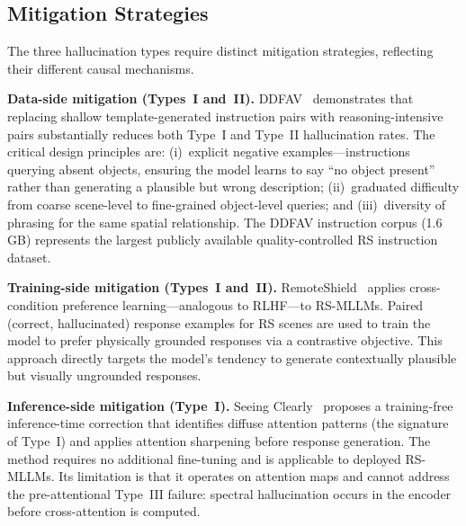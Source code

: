 \subsection{Mitigation Strategies}\label{sec7:mitig}

The three hallucination types require distinct mitigation strategies,
reflecting their different causal mechanisms.

\textbf{Data-side mitigation (Types~I and~II).}
DDFAV~\cite{ddfav2025} demonstrates that replacing shallow template-generated
instruction pairs with reasoning-intensive pairs substantially reduces
both Type~I and Type~II hallucination rates. The critical design principles
are: (i)~explicit negative examples---instructions querying absent objects,
ensuring the model learns to say ``no object present'' rather than generating
a plausible but wrong description; (ii)~graduated difficulty from coarse
scene-level to fine-grained object-level queries; and (iii)~diversity of
phrasing for the same spatial relationship. The DDFAV instruction corpus
(1.6\,GB) represents the largest publicly available quality-controlled RS
instruction dataset.

\textbf{Training-side mitigation (Types~I and~II).}
RemoteShield~\cite{remoteshield2026} applies cross-condition preference
learning---analogous to RLHF---to RS-MLLMs. Paired (correct, hallucinated)
response examples for RS scenes are used to train the model to prefer
physically grounded responses via a contrastive objective. This approach
directly targets the model's tendency to generate contextually plausible
but visually ungrounded responses.

\textbf{Inference-side mitigation (Type~I).}
Seeing Clearly~\cite{seeingclearly2026} proposes a training-free
inference-time correction that identifies diffuse attention patterns
(the signature of Type~I) and applies attention sharpening before
response generation. The method requires no additional fine-tuning and
is applicable to deployed RS-MLLMs. Its limitation is that it operates
on attention maps and cannot address the pre-attentional Type~III
failure: spectral hallucination occurs in the encoder before
cross-attention is computed.

